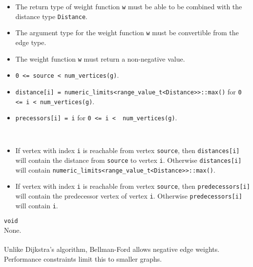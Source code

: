 \begin{itemdescr}
      \pnum\mandates
      \begin{itemize}
            \item
                  The return type of weight function \lstinline{w} must be able to
                  be combined with the distance type \lstinline{Distance}.
            \item
                  The argument type for the weight function \lstinline{w} must be convertible from the edge type.
            \item
                  The weight function \lstinline{w} must return a non-negative value.
      \end{itemize}
      \pnum\preconditions
      \begin{itemize}
            \item
                  \lstinline{0 <= source < num_vertices(g)}. 
                  \\ 
            \item
                  \lstinline{distance[i] = numeric_limits<range_value_t<Distance>>::max()}
                  for \lstinline{0 <= i < num_vertices(g)}.  
                  \\ 
            \item
                  \lstinline{precessors[i] = i} for \lstinline{0 <= i <  num_vertices(g)}.
      \end{itemize}
      \pnum\effects \\
      \pnum\result
      \begin{itemize}
            \item
                  If vertex with index \lstinline{i} is reachable from vertex \lstinline{source}, then
                  \lstinline{distances[i]} will contain the distance from \lstinline{source} to vertex
                  \lstinline{i}.  Otherwise \lstinline{distances[i]} will contain
                  \lstinline{numeric_limits<range_value_t<Distance>>::max()}.
            \item
                  If vertex with index \lstinline{i} is reachable
                  from vertex \lstinline{source}, then \lstinline{predecessors[i]} will contain the
                  predecessor vertex of vertex \lstinline{i}. Otherwise \lstinline{predecessors[i]} will contain
                  \lstinline{i}.
      \end{itemize}
      \pnum\returns \lstinline{void} \\
      \pnum\throws None. \\
      \pnum\complexity \\
      \pnum\remarks Unlike Dijkstra's algorithm, Bellman-Ford allows negative edge weights. Performance constraints limit this to smaller graphs. \\
\end{itemdescr}


